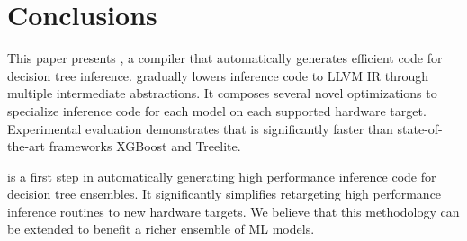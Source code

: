\section{Conclusions}
This paper presents \Treebeard{}, a compiler that automatically generates  
efficient code for decision tree inference. \Treebeard{} gradually lowers  
inference code to LLVM IR through multiple intermediate abstractions.
It composes several novel optimizations to specialize inference code 
for each model on each supported hardware target. 
Experimental evaluation demonstrates that \Treebeard{} is 
significantly faster than state-of-the-art frameworks XGBoost and Treelite.

\Treebeard{} is a first step in automatically generating high performance
inference code for decision tree ensembles. It significantly simplifies retargeting 
high performance inference routines to new hardware targets. We believe that this methodology
can be extended to benefit a richer ensemble of ML models. 